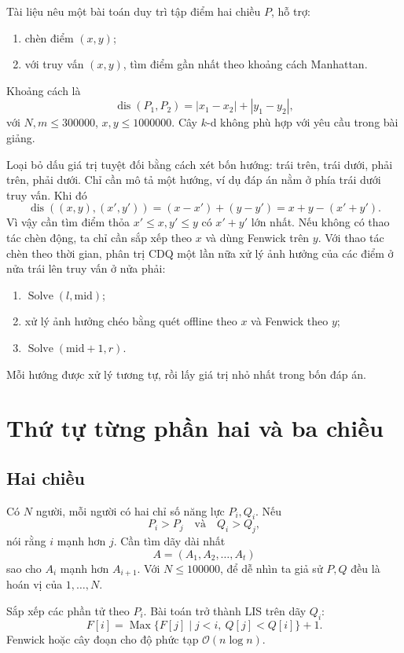 \documentclass[11pt]{article}
\newcommand{\Oh}{\mathcal{O}}
\newcommand{\midp}{\mathrm{mid}}
\newcommand{\Max}{\operatorname{Max}}
\newcommand{\Solve}{\operatorname{Solve}}
\newcommand{\dis}{\operatorname{dis}}
\begin{document}
Tài liệu nêu một bài toán duy trì tập điểm hai chiều \(P\), hỗ trợ:
\begin{enumerate}
  \item chèn điểm \((x,y)\);
  \item với truy vấn \((x,y)\), tìm điểm gần nhất theo khoảng cách Manhattan.
\end{enumerate}
Khoảng cách là
\[
  \dis(P_1,P_2)=|x_1-x_2|+|y_1-y_2|,
\]
với \(N,m\le 300000\), \(x,y\le 1000000\). Cây \(k\)-d không phù hợp với
yêu cầu trong bài giảng.

Loại bỏ dấu giá trị tuyệt đối bằng cách xét bốn hướng: trái trên, trái
dưới, phải trên, phải dưới. Chỉ cần mô tả một hướng, ví dụ đáp án nằm ở
phía trái dưới truy vấn. Khi đó
\[
  \dis((x,y),(x',y'))=(x-x')+(y-y')=x+y-(x'+y').
\]
Vì vậy cần tìm điểm thỏa \(x'\le x, y'\le y\) có \(x'+y'\) lớn nhất. Nếu
không có thao tác chèn động, ta chỉ cần sắp xếp theo \(x\) và dùng Fenwick
trên \(y\). Với thao tác chèn theo thời gian, phân trị CDQ một lần nữa xử lý
ảnh hưởng của các điểm ở nửa trái lên truy vấn ở nửa phải:
\begin{enumerate}
  \item \(\Solve(l,\midp)\);
  \item xử lý ảnh hưởng chéo bằng quét offline theo \(x\) và Fenwick theo
  \(y\);
  \item \(\Solve(\midp+1,r)\).
\end{enumerate}
Mỗi hướng được xử lý tương tự, rồi lấy giá trị nhỏ nhất trong bốn đáp án.

\section{Thứ tự từng phần hai và ba chiều}

\subsection{Hai chiều}

Có \(N\) người, mỗi người có hai chỉ số năng lực \(P_i,Q_i\). Nếu
\[
  P_i>P_j\quad\text{và}\quad Q_i>Q_j,
\]
nói rằng \(i\) mạnh hơn \(j\). Cần tìm dãy dài nhất
\[
  A=(A_1,A_2,\ldots,A_t)
\]
sao cho \(A_i\) mạnh hơn \(A_{i+1}\). Với \(N\le 100000\), để dễ nhìn ta giả
sử \(P,Q\) đều là hoán vị của \(1,\ldots,N\).

Sắp xếp các phần tử theo \(P_i\). Bài toán trở thành LIS trên dãy \(Q_i\):
\[
  F[i]=\Max\{F[j]\mid j<i,\ Q[j]<Q[i]\}+1.
\]
Fenwick hoặc cây đoạn cho độ phức tạp \(\Oh(n\log n)\).
\end{document}
